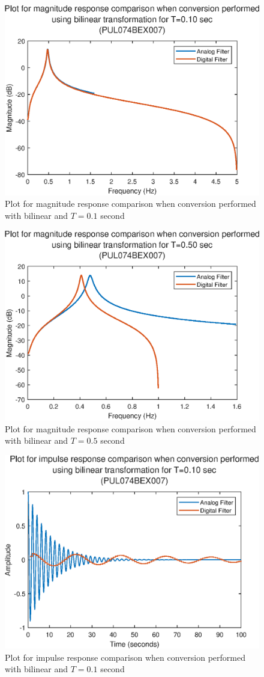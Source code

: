 \documentclass{lab_sheet}
\begin{document}
\begin{figure}[H]
    \centering
    \includegraphics[width=0.7\linewidth]{../Figures/mag_res_bilinear transformation_0.eps}
    \caption{Plot for magnitude response comparison when conversion performed with bilinear and $T=0.1$ second}
    \label{fig:5_1_e}
\end{figure}

\begin{figure}[H]
    \centering
    \includegraphics[width=0.7\linewidth]{../Figures/mag_res_bilinear transformation_1.eps}
    \caption{Plot for magnitude response comparison when conversion performed with bilinear and $T=0.5$ second}
    \label{fig:5_1_f}
\end{figure}

\begin{figure}[H]
    \centering
    \includegraphics[width=0.7\linewidth]{../Figures/impulse_res_bilinear transformation_0.eps}
    \caption{Plot for impulse response comparison when conversion performed with bilinear and $T=0.1$ second}
    \label{fig:5_1_g}
\end{figure}
\end{document}
